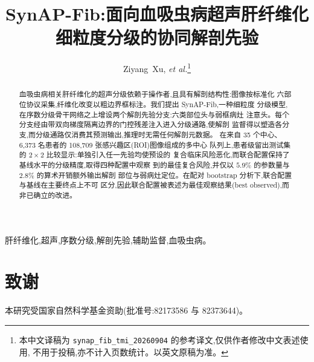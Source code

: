 \documentclass[journal]{IEEEtran}
\begin{document}
\title{SynAP-Fib:面向血吸虫病超声肝纤维化细粒度分级的协同解剖先验}

\author{Ziyang~Xu, \textit{et al.}\thanks{本中文译稿为
\texttt{synap\_fib\_tmi\_20260904} 的参考译文,仅供作者修改中文表述使用,
不用于投稿,亦不计入页数统计。以英文原稿为准。}}

\maketitle

\begin{abstract}
血吸虫病相关肝纤维化的超声分级依赖于操作者,且具有解剖结构性:图像按标准化
六部位协议采集,纤维化改变以粗边界框标注。我们提出 SynAP-Fib,一种细粒度
分级模型,在序数分级骨干网络之上增设两个解剖先验分支:六类部位头与弱框病灶
注意头。每个分支经由带双向梯度隔离边界的门控残差注入进入分级通路,使解剖
监督得以塑造各分支,而分级通路仅消费其预测输出,推理时无需任何解剖元数据。
在来自 35 个中心、6,373 名患者的 108,709 张感兴趣区(ROI)图像组成的多中心
队列上,患者级留出测试集的 $2\times2$ 比较显示:单独引入任一先验均使预设的
复合临床风险恶化,而联合配置保持了基线水平的分级精度,取得四种配置中观察
到的最佳复合风险,并仅以 $5.9\%$ 的参数量与 $2.8\%$ 的算术开销额外输出解剖
部位与弱病灶定位。在配对 bootstrap 分析下,联合配置与基线在主要终点上不可
区分,因此联合配置被表述为最佳观察结果(best observed),而非已确立的改进。
\end{abstract}

\begin{IEEEkeywords}
肝纤维化,超声,序数分级,解剖先验,辅助监督,血吸虫病。
\end{IEEEkeywords}





















\section*{致谢}
本研究受国家自然科学基金资助(批准号:82173586 与 82373644)。
\end{document}
